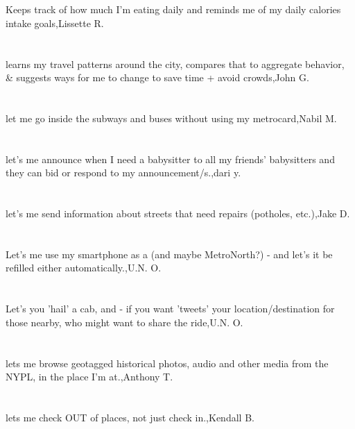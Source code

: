 \section{}Keeps track of how much I'm eating daily and reminds me of my daily calories intake goals,Lissette R.	
\section{}learns my travel patterns around the city, compares that to aggregate behavior, \& suggests ways for me to change to save time + avoid crowds,John G.	
\section{}let me go inside the subways and buses without using my metrocard,Nabil M.	
\section{}let's me announce when I need a babysitter to all my friends' babysitters and they can bid or respond to my announcement/s.,dari y.	
\section{}let's me send information about streets that need repairs (potholes, etc.),Jake D.	
\section{}Let's me use my smartphone as a  (and maybe MetroNorth?) - and let's it be refilled either automatically.,U.N. O.	
\section{}Let's you 'hail' a cab, and - if you want 'tweets' your location/destination for those nearby, who might want to share the ride,U.N. O.	
\section{}lets me browse geotagged historical photos, audio and other media from the NYPL, in the place I'm at.,Anthony T.	
\section{}lets me check OUT of places, not just check in.,Kendall B.	
